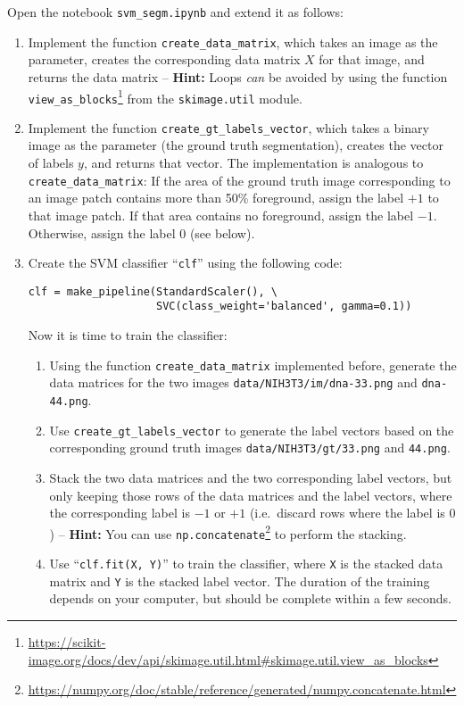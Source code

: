 \documentclass[12pt,a4paper]{article}
\begin{document}
Open the notebook \texttt{svm\_segm.ipynb} and extend it as follows:
\begin{enumerate}
    \item Implement the function \texttt{create\_data\_matrix}, which takes an image as the parameter, creates the corresponding data matrix $X$ for that image, and returns the data matrix -- \textbf{Hint:} Loops \emph{can} be avoided by using the function \texttt{view\_as\_blocks}\footnote{\mbox{\url{https://scikit-image.org/docs/dev/api/skimage.util.html\#skimage.util.view\_as\_blocks}}} from the \texttt{skimage.util} module.
    \item Implement the function \texttt{create\_gt\_labels\_vector}, which takes a binary image as the parameter (the ground truth segmentation), creates the vector of labels $y$, and returns that vector. The implementation is analogous to \texttt{create\_data\_matrix}: If the area of the ground truth image corresponding to an image patch contains more than 50\% foreground, assign the label $+1$ to that image patch. If that area contains no foreground, assign the label $-1$. Otherwise, assign the label $0$ (see below).
    \item Create the SVM classifier ``\texttt{clf}'' using the following code:
\begin{Verbatim}[frame=single]
clf = make_pipeline(StandardScaler(), \
                    SVC(class_weight='balanced', gamma=0.1))
\end{Verbatim}
    Now it is time to train the classifier:
    \begin{enumerate}
        \item Using the function \texttt{create\_data\_matrix} implemented before, generate the data matrices for the two images \texttt{data/NIH3T3/im/dna-33.png} and \texttt{dna-44.png}.
        \item Use \texttt{create\_gt\_labels\_vector} to generate the label vectors based on the corresponding ground truth images \texttt{data/NIH3T3/gt/33.png} and \texttt{44.png}.
        \item Stack the two data matrices and the two corresponding label vectors, but only keeping those rows of the data matrices and the label vectors, where the corresponding label is $-1$ or $+1$ (i.e.\ discard rows where the label is $0$) -- \textbf{Hint:} You can use \texttt{np.concatenate}\footnote{\mbox{\url{https://numpy.org/doc/stable/reference/generated/numpy.concatenate.html}}} to perform the stacking.
        \item Use ``\texttt{clf.fit(X, Y)}'' to train the classifier, where \texttt{X} is the stacked data matrix and \texttt{Y} is the stacked label vector. The duration of the training depends on your computer, but should be complete within a few seconds.

\end{enumerate}
\end{enumerate}
\end{document}
